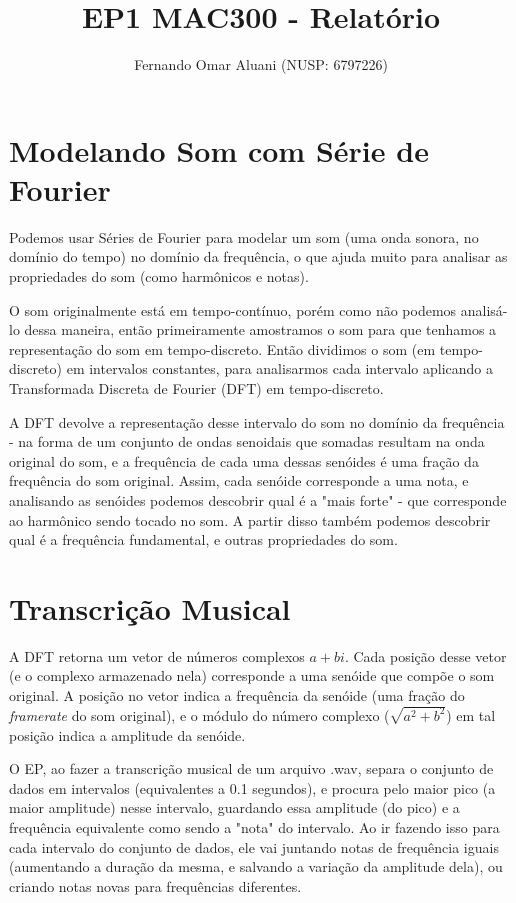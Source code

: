 \documentclass[a4paper,11pt]{article}
\title{EP1 MAC300 - Relatório}
\author{Fernando Omar Aluani (NUSP: 6797226)}
\begin{document}
\maketitle

\section{Modelando Som com Série de Fourier}

Podemos usar Séries de Fourier para modelar um som (uma onda sonora, no domínio do tempo) no domínio da frequência,
o que ajuda muito para analisar as propriedades do som (como harmônicos e notas).

O som originalmente está em tempo-contínuo, porém como não podemos analisá-lo dessa maneira, então primeiramente
amostramos o som para que tenhamos a representação do som em tempo-discreto. Então dividimos o som (em tempo-discreto)
em intervalos constantes, para analisarmos cada intervalo aplicando a Transformada Discreta de Fourier 
(DFT) em tempo-discreto.

A DFT devolve a representação desse intervalo do som no domínio da frequência - na forma de um
conjunto de ondas senoidais que somadas resultam na onda original do som, e a frequência de cada uma dessas senóides é
uma fração da frequência do som original. Assim, cada senóide corresponde a uma nota, e analisando as senóides podemos 
descobrir qual é a "mais forte" - que corresponde ao harmônico sendo tocado no som. A partir disso também podemos descobrir
qual é a frequência fundamental, e outras propriedades do som.

\section{Transcrição Musical}

A DFT retorna um vetor de números complexos $a + bi$. Cada posição desse vetor (e o complexo armazenado nela) corresponde
a uma senóide que compõe o som original. A posição no vetor indica a frequência da senóide (uma fração do \textit{framerate}
do som original), e o módulo do número complexo ($\sqrt{a^{2} + b^{2}}$) em tal posição indica a amplitude da senóide.

O EP, ao fazer a transcrição musical de um arquivo .wav, separa o conjunto de dados em intervalos (equivalentes a 0.1
segundos), e procura pelo maior pico (a maior amplitude) nesse intervalo, guardando essa amplitude (do pico) e a frequência
equivalente como sendo a "nota" do intervalo. Ao ir fazendo isso para cada intervalo do conjunto de dados, ele vai juntando
notas de frequência iguais (aumentando a duração da mesma, e salvando a variação da amplitude dela), ou criando notas novas
para frequências diferentes.
\end{document}
